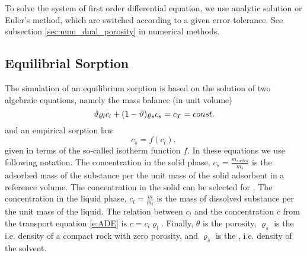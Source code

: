 To solve the system of first order differential equation, we use analytic solution or Euler's method,
which are switched according to a given error tolerance. See subsection \ref{sec:num_dual_porosity} 
in numerical methods.
 

\subsection{Equilibrial Sorption}
\label{sec:sorp_math}

The simulation of an equilibrium sorption is based on the solution of two algebraic equations, namely the mass balance (in unit volume)
\begin{equation}
\label{eq:mass_balance_sorption}
\th \varrho_l c_l + (1-\th) \varrho_s c_s = c_T = const.
\end{equation}
and an empirical sorption law
\begin{equation}
\label{eq:relation_cs_cl}
c_s = f(c_l),
\end{equation}
given in terms of the so-called isotherm function $f$.  In these equations we use following notation. 
The concentration in the solid phase, $c_s = \frac{m_{sorbed}}{m_s}$ \units{}{}{} is the adsorbed mass of the substance
per the unit mass of the solid adsorbent in a reference volume. The concentration
in the solid can be selected for .
The concentration in the liquid phase, $c_l = \frac{m}{m_l}$ \units{}{}{} is the mass of dissolved substance
per the unit mass of the liquid. The relation between $c_l$ and the concentration $c$ from 
       the transport equation \eqref{e:ADE} is $c = c_l \varrho_l$.
 Finally, $\theta$ is the porosity, $\varrho_s$ is the  i.e. density of a compact rock with zero porosity,
 and $\varrho_s$ is the , i.e. density of the solvent.


